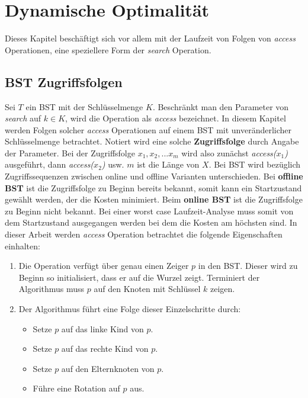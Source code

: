 \documentclass[a4paper,12pt]{article}
\begin{document}
\newpage
\section{Dynamische Optimalität}
Dieses Kapitel beschäftigt sich vor allem mit der Laufzeit von Folgen von \textit{access} Operationen, eine speziellere Form der \textit{search} Operation.  
\subsection{BST Zugriffsfolgen}
Sei $T$ ein BST mit der Schlüsselmenge $K$. Beschränkt man den Parameter von \textit{search} auf $k \in K $, wird  die Operation als \textit{access} bezeichnet. In diesem Kapitel werden Folgen solcher \textit{access} Operationen auf einem BST mit unveränderlicher Schlüsselmenge betrachtet. Notiert wird eine solche \textbf{Zugriffsfolge} durch Angabe der Parameter. Bei der Zugriffsfolge $x_1,x_2,...x_m$ wird also zunächst \textit{access($x_1$)} ausgeführt, dann \textit{access($x_2$)} usw. $m$ ist die Länge von $X$. Bei BST wird bezüglich Zugriffssequenzen zwischen online und offline Varianten unterschieden. Bei \textbf{offline BST} ist die Zugriffsfolge zu Beginn bereits bekannt, somit kann ein Startzustand gewählt werden, der die Kosten minimiert. Beim \textbf{online BST} ist die Zugriffsfolge zu Beginn nicht bekannt. Bei einer worst case Laufzeit-Analyse muss somit von dem Startzustand ausgegangen werden bei dem die Kosten am höchsten sind.
In dieser Arbeit werden \textit{access} Operation betrachtet die folgende Eigenschaften einhalten:

\begin{enumerate} 
	\item Die Operation verfügt über genau einen Zeiger $p$ in den BST. Dieser wird zu Beginn so initialisiert, dass er auf die Wurzel zeigt. Terminiert der Algorithmus muss $p$ auf den Knoten mit Schlüssel $k$ zeigen.
	\item Der Algorithmus führt eine Folge dieser Einzelschritte durch:
	\begin{itemize}
		\item Setze $p$ auf das linke Kind von $p$.
		\item Setze $p$ auf das rechte Kind von $p$.
		\item Setze $p$ auf den Elternknoten von $p$.
		\item Führe eine Rotation auf $p$ aus.
	\end{itemize}  
	
\end{enumerate}
\end{document}
